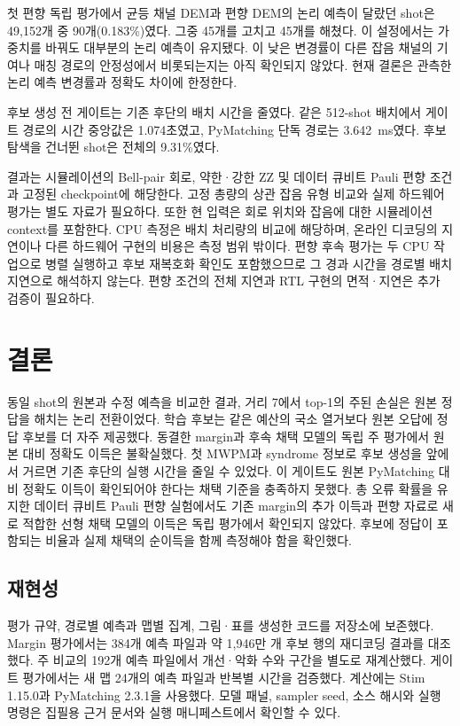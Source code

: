 \documentclass[aps,prd,12pt,twocolumn,superscriptaddress,floatfix]{revtex4-2}
\begin{document}
첫 편향 독립 평가에서 균등 채널 DEM과 편향 DEM의 논리 예측이 달랐던 shot은 49,152개 중 90개(0.183\%)였다. 그중 45개를 고치고 45개를 해쳤다. 이 설정에서는 가중치를 바꿔도 대부분의 논리 예측이 유지됐다. 이 낮은 변경률이 다른 잡음 채널의 기여나 매칭 경로의 안정성에서 비롯되는지는 아직 확인되지 않았다. 현재 결론은 관측한 논리 예측 변경률과 정확도 차이에 한정한다.

후보 생성 전 게이트는 기존 후단의 배치 시간을 줄였다. 같은 512-shot 배치에서 게이트 경로의 시간 중앙값은 1.074초였고, PyMatching 단독 경로는 3.642~ms였다. 후보 탐색을 건너뛴 shot은 전체의 9.31\%였다.

결과는 시뮬레이션의 Bell-pair 회로, 약한·강한 ZZ 및 데이터 큐비트 Pauli 편향 조건과 고정된 checkpoint에 해당한다. 고정 총량의 상관 잡음 유형 비교와 실제 하드웨어 평가는 별도 자료가 필요하다. 또한 현 입력은 회로 위치와 잡음에 대한 시뮬레이션 context를 포함한다. CPU 측정은 배치 처리량의 비교에 해당하며, 온라인 디코딩의 지연이나 다른 하드웨어 구현의 비용은 측정 범위 밖이다. 편향 후속 평가는 두 CPU 작업으로 병렬 실행하고 후보 재복호화 확인도 포함했으므로 그 경과 시간을 경로별 배치 지연으로 해석하지 않는다. 편향 조건의 전체 지연과 RTL 구현의 면적·지연은 추가 검증이 필요하다.

\section{결론}

동일 shot의 원본과 수정 예측을 비교한 결과, 거리 7에서 top-1의 주된 손실은 원본 정답을 해치는 논리 전환이었다. 학습 후보는 같은 예산의 국소 열거보다 원본 오답에 정답 후보를 더 자주 제공했다. 동결한 margin과 후속 채택 모델의 독립 주 평가에서 원본 대비 정확도 이득은 불확실했다. 첫 MWPM과 syndrome 정보로 후보 생성을 앞에서 거르면 기존 후단의 실행 시간을 줄일 수 있었다. 이 게이트도 원본 PyMatching 대비 정확도 이득이 확인되어야 한다는 채택 기준을 충족하지 못했다. 총 오류 확률을 유지한 데이터 큐비트 Pauli 편향 실험에서도 기존 margin의 추가 이득과 편향 자료로 새로 적합한 선형 채택 모델의 이득은 독립 평가에서 확인되지 않았다. 후보에 정답이 포함되는 비율과 실제 채택의 순이득을 함께 측정해야 함을 확인했다.

\subsection{재현성}

평가 규약, 경로별 예측과 맵별 집계, 그림·표를 생성한 코드를 저장소에 보존했다. Margin 평가에서는 384개 예측 파일과 약 1,946만 개 후보 행의 재디코딩 결과를 대조했다. 주 비교의 192개 예측 파일에서 개선·악화 수와 구간을 별도로 재계산했다. 게이트 평가에서는 새 맵 24개의 예측 파일과 반복별 시간을 검증했다. 계산에는 Stim 1.15.0과 PyMatching 2.3.1을 사용했다. 모델 패널, sampler seed, 소스 해시와 실행 명령은 집필용 근거 문서와 실행 매니페스트에서 확인할 수 있다.
\end{document}
